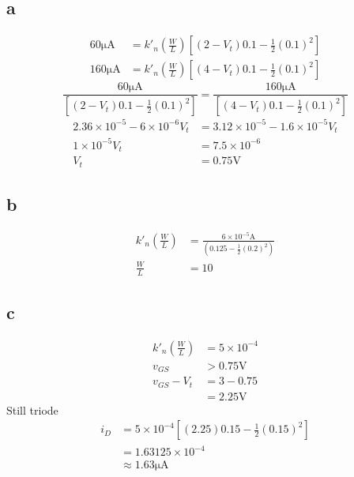 \documentclass{article}
\begin{document}
\begin{multicols}{2}
    \subsection*{a}
    \begin{align*}
        60\si{\micro\ampere}  & = k'_n \left(\frac{W}{L}\right) \left[\left(2-V_t\right)0.1 - \frac{1}{2}{(0.1)}^2\right] \\
        160\si{\micro\ampere} & = k'_n \left(\frac{W}{L}\right) \left[\left(4-V_t\right)0.1 - \frac{1}{2}{(0.1)}^2\right]
    \end{align*}
    \[
        \frac{60\si{\micro\ampere}}{\left[\left(2-V_t\right)0.1 - \frac{1}{2}{(0.1)}^2\right]}  = \frac{160\si{\micro\ampere}}{\left[\left(4-V_t\right)0.1 - \frac{1}{2}{(0.1)}^2\right] }
    \]
    \begin{align*}
        2.36\times 10^{-5} - 6\times 10^{-6} V_t & = 3.12\times 10^{-5} - 1.6\times 10^{-5} V_t \\
        1\times10^{-5} V_t                       & = 7.5\times 10^{-6}                          \\
        V_t                                      & = 0.75\si{\volt}
    \end{align*}
    \subsection*{b}
    \begin{align*}
        k'_n \left(\frac{W}{L}\right) & = \frac{6\times 10^{-5} \si{\ampere}}{\left( 0.125 - \frac{1}{2}{\left( 0.2 \right)}^2 \right)} \\
        \frac{W}{L}                   & = 10
    \end{align*}
    \subsection*{c}
    \begin{align*}
        k'_n \left(\frac{W}{L}\right) & = 5 \times 10^{-4} \\
        v_{GS}                        & > 0.75\si{\volt}   \\
        v_{GS} - V_t                  & = 3 - 0.75         \\
                                      & = 2.25\si{\volt}
    \end{align*}
    Still triode
    \begin{align*}
        i_D & = 5\times 10^{-4} \left[ \left(2.25\right)0.15 - \frac{1}{2} {\left(0.15\right)}^2 \right] \\
            & =1.63125\times10^{-4}                                                                      \\
            & \approx 1.63\si{\micro\ampere}
    \end{align*}

\end{multicols}
\end{document}
